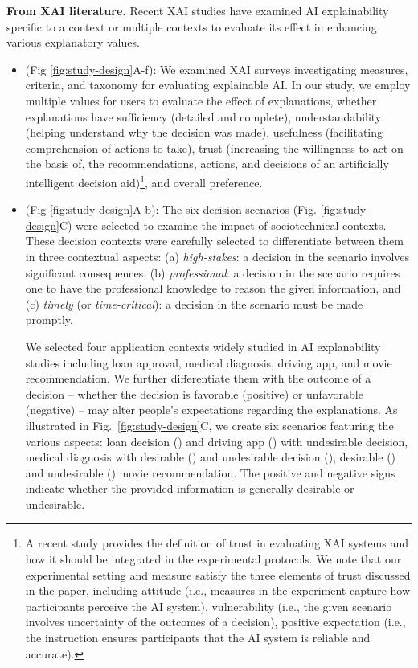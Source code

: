 \textbf{From XAI literature.} Recent XAI studies have examined AI explainability specific to a context or multiple contexts to evaluate its effect in enhancing various explanatory values.

\begin{itemize}
    \item \textbf{} (Fig \ref{fig:study-design}A-f): We examined XAI surveys \cite{MetricsExplainableAIChallenges, TaxonomyHumanSubjectEvaluation, ScienceHumanAIDecisionMakingSurvey} investigating measures, criteria, and taxonomy for evaluating explainable AI. In our study, we employ multiple values for users to evaluate the effect of explanations, whether explanations have sufficiency (detailed and complete), understandability (helping understand why the decision was made), usefulness (facilitating comprehension of actions to take), trust (increasing the willingness to act on the basis of, the recommendations, actions, and decisions of an artificially intelligent decision aid)\footnote{A recent study \cite{HowEvaluateTrustAIAssistedDecision} provides the definition of trust in evaluating XAI systems and how it should be integrated in the experimental protocols. We note that our experimental setting and measure satisfy the three elements of trust discussed in the paper, including attitude (i.e., measures in the experiment capture how participants perceive the AI system), vulnerability (i.e., the given scenario involves uncertainty of the outcomes of a decision), positive expectation (i.e., the instruction ensures participants that the AI system is reliable and accurate).}, and overall preference.
    \item \textbf{} (Fig \ref{fig:study-design}A-b): The six decision scenarios (Fig. \ref{fig:study-design}C) were selected to examine the impact of sociotechnical contexts. These decision contexts were carefully selected to differentiate between them in three contextual aspects: (a) {\it high-stakes}: a decision in the scenario involves significant consequences, (b) {\it professional}: a decision in the scenario requires one to have the professional knowledge to reason the given information, and (c) {\it timely} (or {\it time-critical}): a decision in the scenario must be made promptly.

    \indent We selected four application contexts widely studied in AI explanability studies including loan approval, medical diagnosis, driving app, and movie recommendation. We further differentiate them with the outcome of a decision -- whether the decision is favorable (positive) or unfavorable (negative) -- may alter people's expectations regarding the explanations. As illustrated in Fig.~\ref{fig:study-design}C, we create six scenarios featuring the various aspects: loan decision (\loanN) and driving app (\drivN) with undesirable decision, medical diagnosis with desirable (\mediP) and undesirable decision (\mediN), desirable (\recomP) and undesirable (\recomN) movie recommendation. The positive and negative signs indicate whether the provided information is generally desirable or undesirable.
\end{itemize}